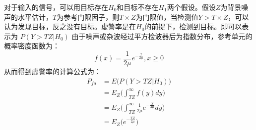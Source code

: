 对于输入的信号，可以用目标存在$H_0$和目标不存在$H_1$两个假设。假设$Z$为背景噪声的水平估计，$T$为参考门限因子，则$T \times Z$为门限值，当检测值$Y > T \times Z$，可以认为发现目标，反之没有目标。虚警率是在$H_0$的前提下，检测到目标。即可以表示为
$P(Y>TZ|H_0)$
由于噪声或杂波经过平方检波器后为指数分布，参考单元的概率密度函数为：
\begin{equation}
	f(x)=\frac{1}{2\mu}e^{-\frac{x}{2\mu}},x \ge 0
\end{equation}
从而得到虚警率的计算公式为：
\begin{equation}
	\begin{split}
			P_{fa} &= E \big( P(Y>TZ|H_0) \big) \\
			&= E_Z\big( \int_{T Z}^{\infty} f(y) d y \big)\\
			&= E_Z\big( \int_{T Z}^{\infty} \frac{1}{2\mu}e^{-\frac{y}{2\mu}} d y  \big)\\
			&= E_Z \big( e^{-\frac{TZ}{2\mu}} \big) \\
	\end{split}	
	\label{虚警率公式}
\end{equation}
